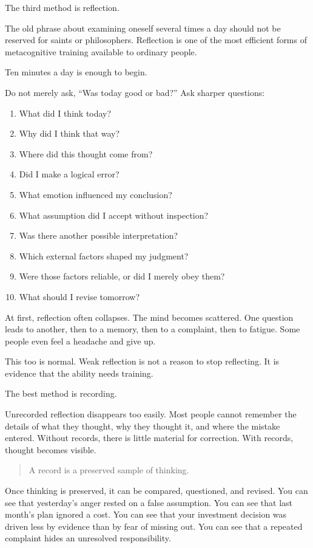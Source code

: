The third method is reflection.

The old phrase about examining oneself several times a day should not be reserved for saints or philosophers. Reflection is one of the most efficient forms of metacognitive training available to ordinary people.

Ten minutes a day is enough to begin.

Do not merely ask, ``Was today good or bad?'' Ask sharper questions:

\begin{enumerate}
\item What did I think today?
\item Why did I think that way?
\item Where did this thought come from?
\item Did I make a logical error?
\item What emotion influenced my conclusion?
\item What assumption did I accept without inspection?
\item Was there another possible interpretation?
\item Which external factors shaped my judgment?
\item Were those factors reliable, or did I merely obey them?
\item What should I revise tomorrow?
\end{enumerate}

At first, reflection often collapses. The mind becomes scattered. One question leads to another, then to a memory, then to a complaint, then to fatigue. Some people even feel a headache and give up.

This too is normal. Weak reflection is not a reason to stop reflecting. It is evidence that the ability needs training.

The best method is recording.

Unrecorded reflection disappears too easily. Most people cannot remember the details of what they thought, why they thought it, and where the mistake entered. Without records, there is little material for correction. With records, thought becomes visible.

\begin{quote}
A record is a preserved sample of thinking.
\end{quote}

Once thinking is preserved, it can be compared, questioned, and revised. You can see that yesterday's anger rested on a false assumption. You can see that last month's plan ignored a cost. You can see that your investment decision was driven less by evidence than by fear of missing out. You can see that a repeated complaint hides an unresolved responsibility.

